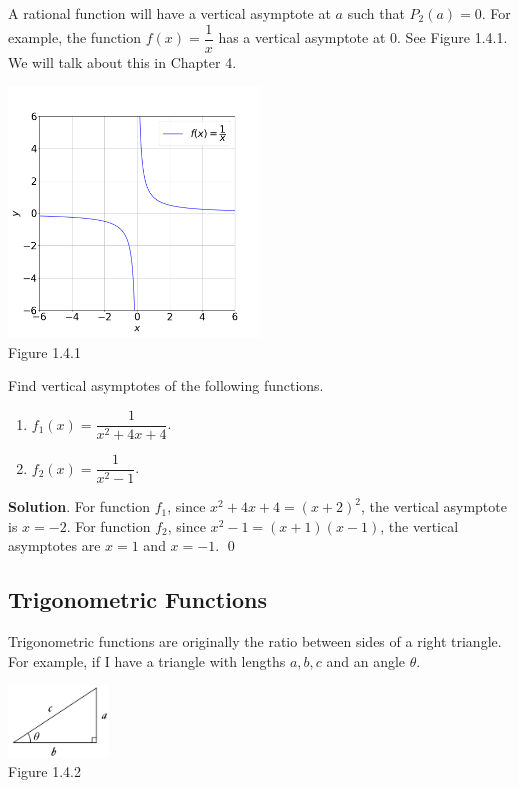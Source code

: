 \documentclass[11pt]{book}
\theoremstyle{break}
\theoremstyle{no_label}
\newcommand{\figtag}[1]{\\[-1.2em]Figure {#1}}
\numberwithin{equation}{section}
\begin{document}
A rational function will have a vertical asymptote at $a$ such that $P_2(a)=0$. For example, the function $f(x)=\dfrac{1}{x}$ has a vertical asymptote at $0$. See Figure 1.4.1. We will talk about this in Chapter 4.

\begin{center}
    \includegraphics[width=0.5\textwidth]{reciprocal_of_x.png}\figtag{1.4.1}
\end{center}

\begin{example}
    Find vertical asymptotes of the following functions.
    \vspace{-1em}
    \begin{multicols}{2}
        \begin{enumerate}
            \item $f_1(x)=\dfrac{1}{x^2+4x+4}$.
            \item $f_2(x)=\dfrac{1}{x^2-1}$.
        \end{enumerate}
    \end{multicols}
    \vspace{0.2em}
\end{example}
\textbf{Solution}. For function $f_1$, since $x^2+4x+4=(x+2)^2$, the vertical asymptote is $x=-2$. For function $f_2$, since $x^2-1=(x+1)(x-1)$, the vertical asymptotes are $x=1$ and $x=-1$. \qed

\subsection*{Trigonometric Functions}

Trigonometric functions are originally the ratio between sides of a right triangle. For example, if I have a triangle with lengths $a, b, c$ and an angle $\theta$.

\begin{center}
    \includegraphics[width=0.2\textwidth]{triangle.JPG}\figtag{1.4.2}
\end{center}
\end{document}
